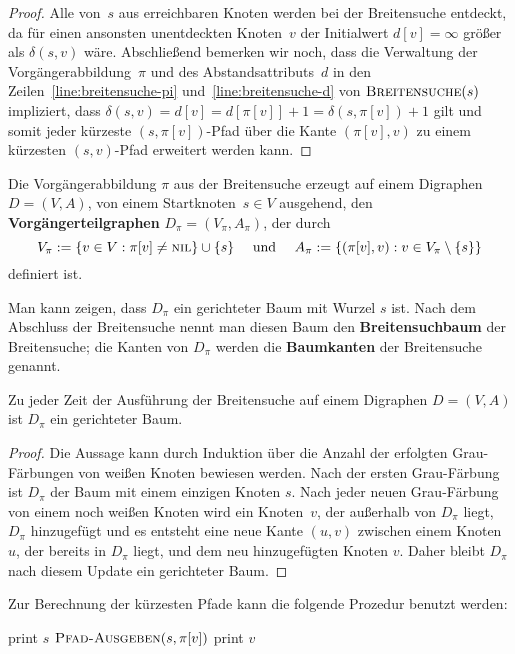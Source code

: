 \begin{proof}
\condclearpage

Alle von~$s$ aus erreichbaren Knoten werden bei der Breitensuche entdeckt, da für einen ansonsten unentdeckten Knoten~$v$ der Initialwert $d[v]=\infty$ größer als $\delta(s,v)$ wäre.
Abschließend bemerken wir noch, dass die Verwaltung der Vorgängerabbildung~$\pi$ und des Abstandsattributs~$d$ in den Zeilen~\ref{line:breitensuche-pi} und~\ref{line:breitensuche-d} von $\mathop{\text{\textsc{Breitensuche}}}(s)$ impliziert, dass $\delta(s,v)=d[v]=d[\pi[v]]+1=\delta(s,\pi[v])+1$ gilt und somit jeder kürzeste $(s,\pi[v])$-Pfad über die Kante $(\pi[v],v)$ zu einem kürzesten $(s,v)$-Pfad erweitert werden kann.
\end{proof}

\begin{defn} 
	Die Vorgängerabbildung $\pi$ aus der Breitensuche erzeugt auf einem Digraphen $D=(V,A)$, von einem Startknoten~$s \in V$ ausgehend, den \textbf{Vorgängerteilgraphen} $D_\pi = (V_\pi,A_\pi)$, der durch
	\[
	V_\pi := \left\{ v \in V : \pi[v] \neq \mathop{\text{\textsc{nil}}}\right\} \cup \{s\} \quad \text{ und } \quad A_\pi := \left\{ (\pi[v],v) : v \in V_\pi \setminus \{s\}\right\}
	\]
	definiert ist.
	
	Man kann zeigen, dass $D_\pi$ ein gerichteter Baum mit Wurzel $s$ ist.
	Nach dem Abschluss der Breitensuche nennt man diesen Baum den \textbf{Breitensuchbaum} der Breitensuche; die Kanten von $D_\pi$ werden die \textbf{Baumkanten} der Breitensuche genannt.
\end{defn}

\begin{prop}
	Zu jeder Zeit der Ausführung der Breitensuche auf einem Digraphen $D=(V,A)$ ist $D_\pi$ ein gerichteter Baum. 
\end{prop} 
\begin{proof} 
	Die Aussage kann durch Induktion über die Anzahl der erfolgten Grau-Färbungen von weißen Knoten bewiesen werden. 
	Nach der ersten Grau-Färbung ist $D_\pi$ der Baum mit einem einzigen Knoten $s$. Nach jeder neuen Grau-Färbung von einem noch weißen Knoten wird ein Knoten~$v$, der außerhalb von $D_\pi $ liegt, $D_\pi$ hinzugefügt und es entsteht eine neue Kante $(u,v)$ zwischen einem Knoten $u$, der bereits in $D_\pi$ liegt, und dem neu hinzugefügten Knoten $v$.
	Daher bleibt $D_\pi$ nach diesem Update ein gerichteter Baum.
\end{proof} 

\begin{bem}Zur Berechnung der kürzesten Pfade kann die folgende Prozedur benutzt werden: 
	\begin{algorithm}[H]
	\caption{$\cc{Pfad-Ausgeben}(s,v)$}
	\begin{algorithmic}[1]
		\STATE print $s$
		\ELSE
		\STATE $\mathop{\text{\textsc{Pfad-Ausgeben}}}(s,\pi[v])$
		\STATE print $v$
		\ENDIF
	\end{algorithmic}
\end{algorithm}
\end{bem}

